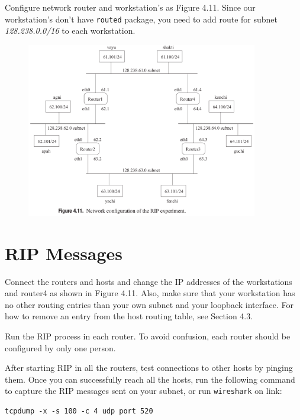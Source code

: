 \documentclass{../UTNetLab}
\begin{document}
    Configure network router and workstation’s as Figure 4.11. Since our workstation’s don’t have \lstinline{routed} package, you need to add route for subnet \textit{128.238.0.0/16} to each workstation.
    \begin{figure}[H]
        \centering
        \includegraphics[width=0.9\textwidth]{img/figure4-11.png}
    \end{figure}
\section{RIP Messages}
    Connect the routers and hosts and change the IP addresses of the workstations and router4 as shown in Figure 4.11.
    Also, make sure that your workstation has no other routing entries than your own subnet and your loopback interface.
    For how to remove an entry from the host routing table, see Section 4.3.

    Run the RIP process in each router.
    To avoid confusion, each router should be configured by only one person.

    After starting RIP in all the routers, test connections to other hosts by pinging them.
    Once you can successfully reach all the hosts, run the following command to capture the RIP messages sent on your subnet, or run \lstinline{wireshark} on link:
    \begin{lstlisting}
tcpdump -x -s 100 -c 4 udp port 520
    \end{lstlisting}
\end{document}
